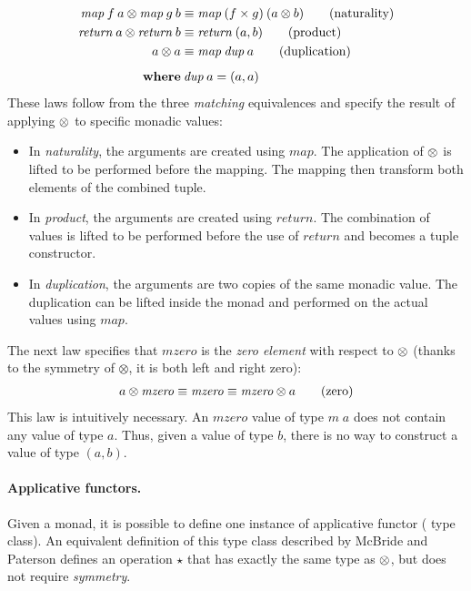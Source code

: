 \documentclass{sigplanconf}
\newcommand{\Varid}[1]{\mathit{#1}}
\begin{document}
\begin{align*}
  \map \: f \: a \mzip \map \: g \: b &\equiv \map \: (f \times g) \: (a \mzip b) \tag{naturality} \\
  \Varid{return} \: a \mzip \Varid{return} \: b &\equiv \Varid{return} \: (a, b) \tag{product} \\
  a \mzip a &\equiv \map \: \Varid{dup} \: a \tag{duplication} \\
\\[-10pt]
  \textbf{where} & \: \Varid{dup} \: a = (a, a)
\end{align*}
These laws follow from the three \textit{matching} equivalences and specify the result of
applying $\otimes$ to specific monadic values:
\begin{itemize}
\item In \textit{naturality}, the arguments are created using \ensuremath{\Varid{map}}. The application of $\otimes$ is
  lifted to be performed before the mapping. The mapping then transform both elements of the 
  combined tuple.
  
\item In \textit{product}, the arguments are created using \ensuremath{\Varid{return}}. The combination of values is
  lifted to be performed before the use of \ensuremath{\Varid{return}} and becomes a tuple constructor.

\item In \textit{duplication}, the arguments are two copies of the same monadic value. The 
  duplication can be lifted inside the monad and performed on the actual values using \ensuremath{\Varid{map}}.

\end{itemize}
The next law specifies that \ensuremath{\Varid{mzero}} is the \textit{zero element} with respect to $\otimes$
(thanks to the symmetry of \ensuremath{\otimes}, it is both left and right zero):
\begin{align*}
  a \mzip \mzero \equiv \mzero \equiv \mzero \mzip a \tag {zero} 
\end{align*}
This law is intuitively necessary. An \ensuremath{\Varid{mzero}} value of type \ensuremath{\Varid{m}\;\Varid{a}} does not contain any value of type
\ensuremath{\Varid{a}}. Thus, given a value of type \ensuremath{\Varid{b}}, there is no way to construct a value of type \ensuremath{(\Varid{a},\Varid{b})}.

\paragraph{Applicative functors.} Given a monad, it is possible to define one instance of applicative
functor ( type class). An equivalent definition of this type class described
by McBride and Paterson \cite{applicative} defines an operation $\star$ that has exactly 
the same type as $\otimes$, but  does not require \textit{symmetry}. 
\end{document}
